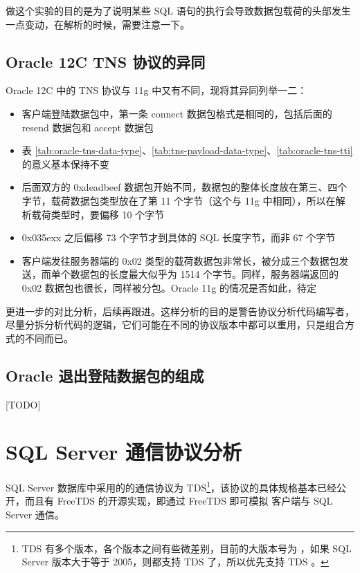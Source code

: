 做这个实验的目的是为了说明某些 SQL 语句的执行会导致数据包载荷的头部发生一点变动，在解析的时候，需要注意一下。

\subsection{Oracle 12C TNS 协议的异同}\label{sec:12c-tns}
Oracle 12C 中的 TNS 协议与 11g 中又有不同，现将其异同列举一二：

\begin{itemize}
    \item 客户端登陆数据包中，第一条 connect 数据包格式是相同的，包括后面的 resend 数据包和 accept 数据包
    \item 表 \ref{tab:oracle-tns-data-type}、\ref{tab:tns-payload-data-type}、\ref{tab:oracle-tns-tti} 的意义基本保持不变

    \item 后面双方的 {\cf 0xdeadbeef} 数据包开始不同，数据包的整体长度放在第三、四个字节，载荷数据包类型放在了第 11 个字节（这个与 11g 中相同），所以在解析载荷类型时，要偏移 10 个字节
    \item {\cf 0x035exx} 之后偏移 73 个字节才到具体的 SQL 长度字节，而非 67 个字节
    \item 客户端发往服务器端的 {\cf 0x02} 类型的载荷数据包非常长，被分成三个数据包发送，而单个数据包的长度最大似乎为 1514 个字节。同样，服务器端返回的 {\cf 0x02} 数据包也很长，同样被分包。Oracle 11g 的情况是否如此，待定
\end{itemize}

更进一步的对比分析，后续再跟进。这样分析的目的是警告协议分析代码编写者，尽量分拆分析代码的逻辑，它们可能在不同的协议版本中都可以重用，只是组合方式的不同而已。

\subsection{Oracle 退出登陆数据包的组成}
[TODO]

\section{SQL Server 通信协议分析}

SQL Server 数据库中采用的的通信协议为 TDS\footnote{TDS 有多个版本，各个版本之间有些微差别，目前的大版本号为 {}，如果 SQL Server 版本大于等于 2005，则都支持 TDS {} 了，所以优先支持 TDS {}。}，该协议的具体规格基本已经公开，而且有 FreeTDS 的开源实现，即通过 FreeTDS 即可模拟 客户端与 SQL Server 通信。

